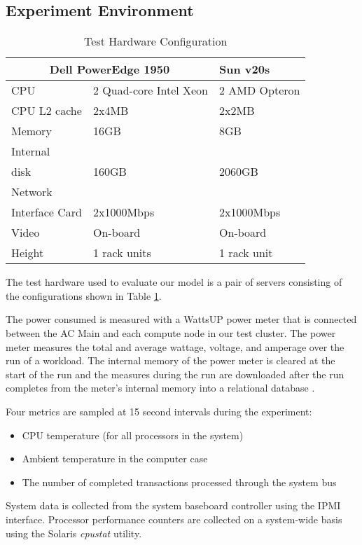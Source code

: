 \documentclass[times, 10pt,onecolumn]{article}
\begin{document}
\subsection{Experiment Environment}
\label{sec:expdesign}
\begin{table}
  \centering
  \label{tab:hardware}
  \begin{tabular}{|l|l|l|}
    \hline
    \multicolumn{2}{c}{\textbf{Dell PowerEdge 1950}}&\textbf{Sun v20s}\\  
    \hline 
    CPU&2 Quad-core Intel Xeon &2 AMD Opteron\\
    \hline 
    CPU L2 cache&2x4MB&2x2MB\\
    \hline 
    Memory&16GB&8GB\\
    \hline 
    Internal\\disk&160GB&2060GB\\
    \hline 
    Network\\ Interface Card&2x1000Mbps&2x1000Mbps\\
    \hline 
    Video&On-board&On-board \\
    \hline 
    Height&1 rack units&1 rack unit\\
    \hline
  \end{tabular}
  \caption{Test Hardware Configuration}
\end{table}
The test hardware used to evaluate our model is a pair of servers
consisting of the configurations shown in Table \ref{tab:hardware}.

The power consumed is measured with a WattsUP \cite{WattsUp2006a} power
meter that is connected between the AC Main and each compute node in our
test cluster.  The power meter measures the total and average wattage,
voltage, and amperage over the run of a workload.  The internal memory
of the power meter is cleared at the start of the run and the measures
during the run are downloaded after the run completes from the meter's
internal memory into a relational database \cite{WattsUp2006b}.

Four metrics are sampled at 15 second intervals during the experiment:
\begin{itemize}
\item CPU temperature (for all processors in the system)
\item Ambient temperature in the computer case
\item The number of completed transactions processed through the system bus
\end{itemize}
System data is collected from the system baseboard controller using the
IPMI interface. Processor performance counters are collected on a
system-wide basis using the Solaris \textit{cpustat} utility.
\end{document}
